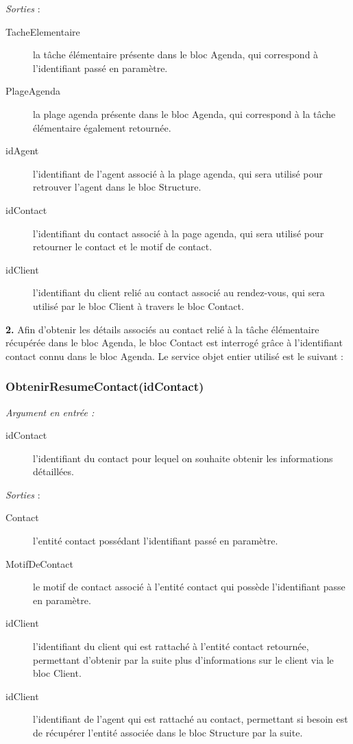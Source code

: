 \noindent \textit{Sorties} : 
\begin{description}
\item[TacheElementaire] la tâche élémentaire présente dans le bloc Agenda, qui correspond à l'identifiant passé en paramètre.
\item[PlageAgenda] la plage agenda présente dans le bloc Agenda, qui correspond à la tâche élémentaire également retournée.
\item[idAgent] l'identifiant de l'agent associé à la plage agenda, qui sera utilisé pour retrouver l'agent dans le bloc Structure. 
\item[idContact] l'identifiant du contact associé à la page agenda, qui sera utilisé pour retourner le contact et le motif de contact.
\item[idClient] l'identifiant du client relié au contact associé au rendez-vous, qui sera utilisé par le bloc Client à travers le bloc Contact. \\
\end{description}

\begin{shaded}
\textbf{2.} Afin d'obtenir les détails associés au contact relié à la tâche élémentaire récupérée dans le bloc Agenda, le bloc Contact est interrogé grâce à l'identifiant contact connu dans le bloc Agenda. Le service objet entier utilisé est le suivant :
\end{shaded}

\subsubsection{ObtenirResumeContact(idContact)}

\noindent \textit{Argument en entrée :}
\begin{description}
\item[idContact] l'identifiant du contact pour lequel on souhaite obtenir les informations détaillées. \\
\end{description}

\noindent \textit{Sorties} :
\begin{description}
\item[Contact] l'entité contact possédant l'identifiant passé en paramètre. 
\item[MotifDeContact] le motif de contact associé à l'entité contact qui possède l'identifiant passe en paramètre.  
\item[idClient] l'identifiant du client qui est rattaché à l'entité contact retournée, permettant d'obtenir par la suite plus d'informations sur le client via le bloc Client. 
\item[idClient] l'identifiant de l'agent qui est rattaché au contact, permettant si besoin est de récupérer l'entité associée dans le bloc Structure par la suite. \\
\end{description}


